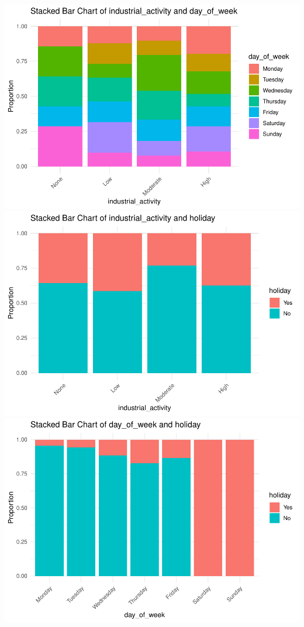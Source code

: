 \documentclass[
]{article}
\begin{document}
\includegraphics{Report_files/figure-latex/unnamed-chunk-4-1.pdf}
\includegraphics{Report_files/figure-latex/unnamed-chunk-4-2.pdf}
\includegraphics{Report_files/figure-latex/unnamed-chunk-4-3.pdf}
\end{document}
